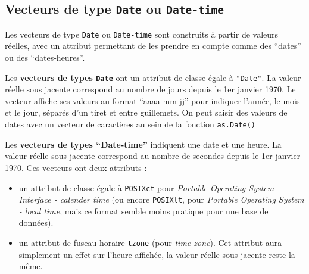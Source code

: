\documentclass[
]{book}
\newenvironment{Shaded}{\begin{snugshade}}{\end{snugshade}}
\newcommand{\CommentTok}[1]{\textcolor[rgb]{0.56,0.35,0.01}{\textit{#1}}}
\newcommand{\DocumentationTok}[1]{\textcolor[rgb]{0.56,0.35,0.01}{\textbf{\textit{#1}}}}
\newcommand{\FunctionTok}[1]{\textcolor[rgb]{0.13,0.29,0.53}{\textbf{#1}}}
\newcommand{\NormalTok}[1]{#1}
\newcommand{\OtherTok}[1]{\textcolor[rgb]{0.56,0.35,0.01}{#1}}
\newcommand{\StringTok}[1]{\textcolor[rgb]{0.31,0.60,0.02}{#1}}
\providecommand{\tightlist}{%
  \setlength{\itemsep}{0pt}\setlength{\parskip}{0pt}}
\begin{document}
\subsection{\texorpdfstring{Vecteurs de type \texttt{Date} ou \texttt{Date-time}}{Vecteurs de type Date ou Date-time}}\label{vecteurs-de-type-date-ou-date-time}

Les vecteurs de type \texttt{Date} ou \texttt{Date-time} sont construits à partir de valeurs réelles, avec un attribut permettant de les prendre en compte comme des ``dates'' ou des ``dates-heures''.

Les \textbf{vecteurs de types \texttt{Date}} ont un attribut de classe égale à \texttt{"Date"}. La valeur réelle sous jacente correspond au nombre de jours depuis le 1er janvier 1970. Le vecteur affiche ses valeurs au format ``aaaa-mm-jj'' pour indiquer l'année, le mois et le jour, séparés d'un tiret et entre guillemets. On peut saisir des valeurs de dates avec un vecteur de caractères au sein de la fonction \texttt{as.Date()}

\begin{Shaded}
\end{Shaded}

Les \textbf{vecteurs de types ``Date-time''} indiquent une date et une heure. La valeur réelle sous jacente correspond au nombre de secondes depuis le 1er janvier 1970. Ces vecteurs ont deux attributs :

\begin{itemize}
\tightlist
\item
  un attribut de classe égale à \texttt{POSIXct} pour \emph{Portable Operating System Interface - calender time} (ou encore \texttt{POSIXlt}, pour \emph{Portable Operating System - local time}, mais ce format semble moins pratique pour une base de données).
\item
  un attribut de fuseau horaire \texttt{tzone} (pour \emph{time zone}). Cet attribut aura simplement un effet sur l'heure affichée, la valeur réelle sous-jacente reste la même.
\end{itemize}
\end{document}
